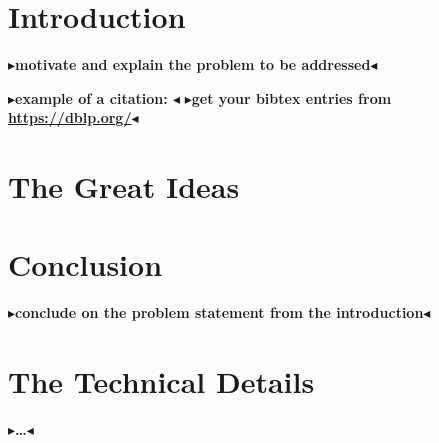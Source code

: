 \documentclass[twoside,11pt,openright]{report}
\newcommand{\todo}[1]{{\color[rgb]{.5,0,0}\textbf{$\blacktriangleright$#1$\blacktriangleleft$}}}
\begin{document}
\chapter{Introduction}
\label{ch:intro}

\todo{motivate and explain the problem to be addressed}

\todo{example of a citation: \cite{DBLP:conf/sas/ChristensenMS03}}
\todo{get your bibtex entries from \url{https://dblp.org/}}


\chapter{The Great Ideas}
\label{ch:main}

\lipsum[1-20] %


\chapter{Conclusion}
\label{ch:conclusion}

\todo{conclude on the problem statement from the introduction}


\cleardoublepage
{}
 



\cleardoublepage
\appendix
\chapter{The Technical Details}

\todo{\dots}
\end{document}
